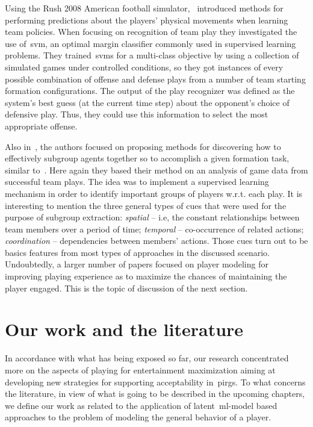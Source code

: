 Using the Rush 2008 American football simulator,~\cite{laviersa_using_2014} introduced methods for performing predictions about the players' physical movements when learning team policies. When focusing on recognition of team play they investigated the use of~\gls{svm}, an optimal margin classifier commonly used in supervised learning problems. They trained~\gls{svm}s for a multi-class objective by using a collection of simulated games under controlled conditions, so they got instances of every possible combination of offense and defense plays from a number of team starting formation configurations. The output of the play recognizer was defined as the system's best guess (at the current time step) about the opponent's choice of defensive play. Thus, they could use this information to select the most appropriate offense.

Also in~\cite{laviersa_using_2014}, the authors focused on proposing methods for discovering how to effectively  subgroup agents together so to accomplish a given formation task, similar to~\cite{stone_task_1999}. Here again they based their method on an analysis of game data from successful team plays. The idea was to implement a supervised learning mechanism in order to identify important groups of players w.r.t. each play. It is interesting to mention the three general types of cues that were used for the purpose of subgroup extraction: \textit{spatial} -- i.e, the constant relationships between team members over a period of time; \textit{temporal} -- co-occurrence of related actions; \textit{coordination} -- dependencies between members' actions. Those cues turn out to be basics features from most types of approaches in the discussed scenario. Undoubtedly, a larger number of papers focused on player modeling for improving playing experience as to maximize the chances of maintaining the player engaged. This is the topic of discussion of the next section.

\section{Our work and the literature}
In accordance with what has being exposed so far, our research concentrated more on the aspects of playing for entertainment maximization aiming at developing new strategies for supporting acceptability in~\gls{pirg}s. To what concerns the literature, in view of what is going to be described in the upcoming chapters, we define our work as related to the application of latent~\gls{ml}-model based approaches to the problem of modeling the general behavior of a player. 

